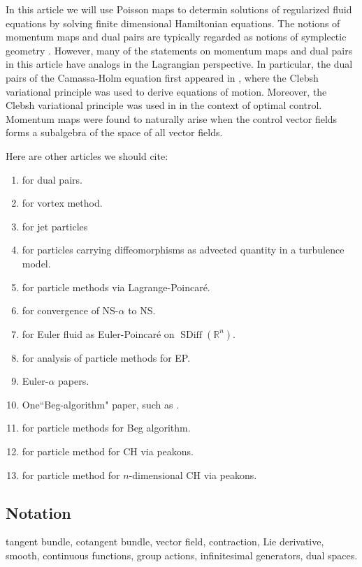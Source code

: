 \documentclass[12pt]{amsart}
\newcommand{\R}{\ensuremath{\mathbb{R}}}
\DeclareMathOperator{\SDiff}{SDiff}
\begin{document}
In this article we will use Poisson maps to determin solutions of regularized
fluid equations by solving finite dimensional Hamiltonian equations.
The notions of momentum maps and dual pairs are typically
regarded as notions of symplectic geometry \cite{FOM,Weinstein1983}.
However, many of the statements on momentum maps and
dual pairs in this article
have analogs in the Lagrangian perspective.
In particular, the dual pairs of the Camassa-Holm equation
first appeared in \cite{HolmMarsden2005}, where the Clebsh
variational principle was used to derive equations of motion.
Moreover, the Clebsh variational principle was used in
\cite{CotterHolm2009} in the context of optimal control.
Momentum maps were found to naturally arise when the
control vector fields forms a subalgebra of the space of all
 vector fields.
 
 Here are other articles we should cite:
 \begin{enumerate}
 	\item \cite{MarsdenWeinstein1983,Weinstein1983} for dual pairs.
 	\item \cite{Chorin1973} for vortex method.
	\item \cite{Sommer2013,CotterHolmJacobsMeier2014} for jet particles
	\item \cite{HolmTronci2012} for particles carrying diffeomorphisms as advected quantity in a turbulence model.
 	\item \cite{DesbrunJacobsRatiu2013} for particle methods via Lagrange-Poincar\'e.
	\item \cite{FoiasHolmTiti2001} for convergence of NS-$\alpha$ to NS.
	\item \cite{Arnold1966} for Euler fluid as Euler-Poincar\'e on $\SDiff(\R^n)$.
	\item \cite{TrouveYounes2005} for analysis of particle methods for EP.
	\item Euler-$\alpha$ papers.
	\item One``Beg-algorithm" paper, such as \cite{Beg2005}.
	\item \cite{JoshiMiller2000} for particle methods for Beg algorithm.
	\item \cite{HoldenRaynaud2006} for particle method for CH via peakons.
	\item \cite{ChertockDuToitMarsden2012} for particle method for $n$-dimensional CH via peakons.
 \end{enumerate}

\subsection{Notation}
tangent bundle, cotangent bundle, vector field, contraction, Lie derivative,
smooth, continuous functions, group actions, infinitesimal generators,
dual spaces.
\end{document}
